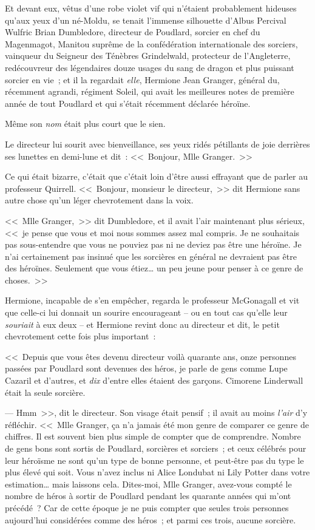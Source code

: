 Et devant eux, vêtus d'une robe violet vif qui n'étaient probablement hideuses qu'aux yeux d'un né-Moldu, se tenait l'immense silhouette d'Albus Percival Wulfric Brian Dumbledore, directeur de Poudlard, sorcier en chef du Magenmagot, Manitou suprême de la confédération internationale des sorciers, vainqueur du Seigneur des Ténèbres Grindelwald, protecteur de l'Angleterre, redécouvreur des légendaires douze usages du sang de dragon et plus puissant sorcier en vie~; et il la regardait \emph{elle}, Hermione Jean Granger, général du, récemment agrandi, régiment Soleil, qui avait les meilleures notes de première année de tout Poudlard et qui s'était récemment déclarée héroïne.

Même son \emph{nom} était plus court que le sien.

Le directeur lui sourit avec bienveillance, ses yeux ridés pétillants de joie derrières ses lunettes en demi-lune et dit~: <<~Bonjour, Mlle Granger.~>>

Ce qui était bizarre, c'était que c'était loin d'être aussi effrayant que de parler au professeur Quirrell. <<~Bonjour, monsieur le directeur,~>> dit Hermione sans autre chose qu'un léger chevrotement dans la voix.

<<~Mlle Granger,~>> dit Dumbledore, et il avait l'air maintenant plus sérieux, <<~je pense que vous et moi nous sommes assez mal compris. Je ne souhaitais pas sous-entendre que vous ne pouviez pas ni ne deviez pas être une héroïne. Je n'ai certainement pas insinué que les sorcières en général ne devraient pas être des héroïnes. Seulement que vous étiez… un peu jeune pour penser à ce genre de choses.~>>

Hermione, incapable de s'en empêcher, regarda le professeur McGonagall et vit que celle-ci lui donnait un sourire encourageant -- ou en tout cas qu'elle leur \emph{souriait} à eux deux -- et Hermione revint donc au directeur et dit, le petit chevrotement cette fois plus important~:

<<~Depuis que vous êtes devenu directeur voilà quarante ans, onze personnes passées par Poudlard sont devenues des héros, je parle de gens comme Lupe Cazaril et d'autres, et \emph{dix} d'entre elles étaient des garçons. Cimorene Linderwall était la seule sorcière.

--- Hmm~>>, dit le directeur. Son visage était pensif~; il avait au moins \emph{l'air} d'y réfléchir. <<~Mlle Granger, ça n'a jamais été mon genre de comparer ce genre de chiffres. Il est souvent bien plus simple de compter que de comprendre. Nombre de gens bons sont sortis de Poudlard, sorcières et sorciers~; et ceux célébrés pour leur héroïsme ne sont qu'un type de bonne personne, et peut-être pas du type le plus élevé qui soit. Vous n'avez inclus ni Alice Londubat ni Lily Potter dans votre estimation… mais laissons cela. Dites-moi, Mlle Granger, avez-vous compté le nombre de héros à sortir de Poudlard pendant les quarante années qui m'ont précédé~? Car de cette époque je ne puis compter que seules trois personnes aujourd'hui considérées comme des héros~; et parmi ces trois, aucune sorcière.


